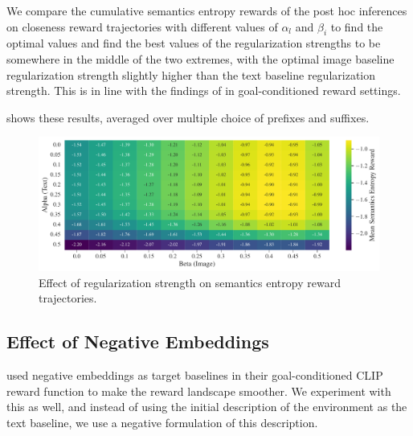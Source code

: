 We compare the cumulative semantics entropy rewards of the post hoc inferences on closeness reward trajectories with different values of \(\alpha_{l}\) and \(\beta_{i}\) to find the optimal values and find the best values of the regularization strengths to be somewhere in the middle of the two extremes, with the optimal image baseline regularization strength slightly higher than the text baseline regularization strength.
This is in line with the findings of \cite{vlmrm} in goal-conditioned reward settings.

 shows these results, averaged over multiple choice of prefixes and suffixes.

\begin{figure}[H]
    \centering
    \includegraphics[width=\textwidth]{images/alpha_beta_temp12avg_noneg.pdf}
    \caption{Effect of regularization strength on semantics entropy reward trajectories.}
    \label{fig:clip-alpha-beta}
\end{figure}




\subsection{Effect of Negative Embeddings}
\label{sec:negative-embeddings}
\cite{negprompt} used negative embeddings as target baselines in their goal-conditioned CLIP reward function to make the reward landscape smoother.
We experiment with this as well, and instead of using the initial description of the environment as the text baseline, we use a negative formulation of this description.


